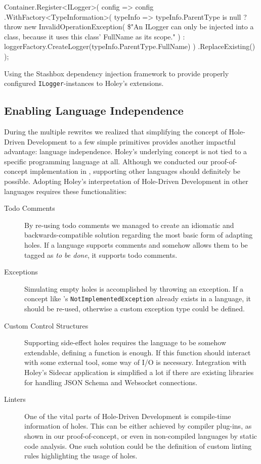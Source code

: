\begin{program}[ht]
\begin{CsCode}
Container.Register<ILogger>(
	config =>
		config
			.WithFactory<TypeInformation>(
				typeInfo =>
					typeInfo.ParentType is null
						? throw new InvalidOperationException(
							\$"An ILogger can only be injected into a class, because it uses this class' FullName as its scope."
						)
						: loggerFactory.CreateLogger(typeInfo.ParentType.FullName)
			)
			.ReplaceExisting()
);
\end{CsCode}
\caption{Using the Stashbox dependency injection framework to provide properly configured \texttt{ILogger}-instances to Holey's extensions.}
\label{prg:holey-supporting-logging}
\end{program}

\subsection{Enabling Language Independence}
During the multiple rewrites we realized that simplifying the concept of Hole-Driven Development to a few simple primitives provides another impactful advantage: language independence.
Holey's underlying concept is not tied to a specific programming language at all.
Although we conducted our proof-of-concept implementation in \CS, supporting other languages should definitely be possible.
Adopting Holey's interpretation of Hole-Driven Development in other languages requires these functionalities:

\begin{description}
    \item[Todo Comments] By re-using todo comments we managed to create an idiomatic and backwards-compatible solution regarding the most basic form of adapting holes. If a language supports comments and somehow allows them to be tagged as \emph{to be done}, it supports todo comments.
    \item[Exceptions] Simulating empty holes is accomplished by throwing an exception. If a concept like \CS's \verb|NotImplementedException| already exists in a language, it should be re-used, otherwise a custom exception type could be defined.
    \item[Custom Control Structures] Supporting side-effect holes requires the language to be somehow extendable, defining a function is enough. If this function should interact with some external tool, some way of I/O is necessary. Integration with Holey's Sidecar application is simplified a lot if there are existing libraries for handling JSON Schema and Websocket connections.
    \item[Linters] One of the vital parts of Hole-Driven Development is compile-time information of holes. This can be either achieved by compiler plug-ins, as shown in our proof-of-concept, or even in non-compiled languages by static code analysis. One such solution could be the definition of custom linting rules highlighting the usage of holes.
\end{description}

